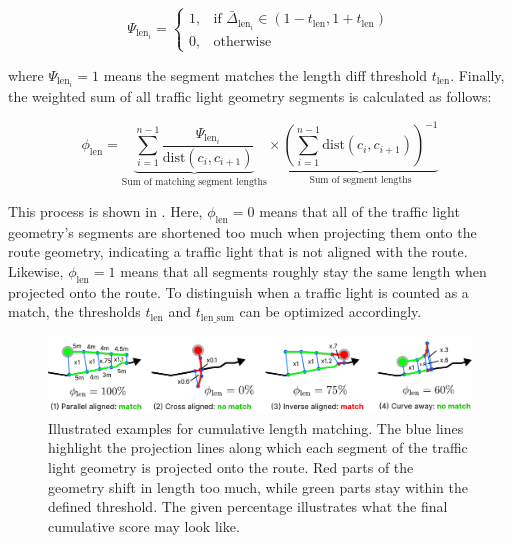 \begin{equation}
\Psi_{\text{len}_i} = 
    \begin{cases}
            1,& \text{if } \bar{\Delta}_{\text{len}_{i}} \in \left(1 - t_{\text{len}}, 1 + t_{\text{len}}\right)\\
            0,              & \text{otherwise}
        \end{cases}
\end{equation}

where $\Psi_{\text{len}_i} = 1$ means the segment matches the length diff threshold $t_{\text{len}}$. Finally, the weighted sum of all traffic light geometry segments is calculated as follows:

\begin{equation} 
\phi_{\text{len}} = 
    \underbrace{\sum_{i=1}^{n-1} 
    \frac{\Psi_{\text{len}_i}}{\text{dist}(c_i, c_{i+1})}}_{\text{Sum of matching segment lengths}}
    \times
    \underbrace{(\sum_{i=1}^{n-1} \text{dist}(c_i, c_{i+1}))^{-1}}_{\text{Sum of segment lengths}}
\end{equation}

This process is shown in . Here, $\phi_{\text{len}} = 0$ means that all of the traffic light geometry's segments are shortened too much when projecting them onto the route geometry, indicating a traffic light that is not aligned with the route. Likewise, $\phi_{\text{len}} = 1$ means that all segments roughly stay the same length when projected onto the route. To distinguish when a traffic light is counted as a match, the thresholds $t_{\text{len}}$ and $t_{\text{len\_sum}}$ can be optimized accordingly.

\begin{figure}[t]
\centering
\includegraphics[width=\linewidth]{images/sg-selection-length-filter-sum.pdf}
\caption{Illustrated examples for cumulative length matching. The blue lines highlight the projection lines along which each segment of the traffic light geometry is projected onto the route. Red parts of the geometry shift in length too much, while green parts stay within the defined threshold. The given percentage illustrates what the final cumulative score may look like.}
\label{fig:sg-selection-length-filter-sum}
\end{figure}

